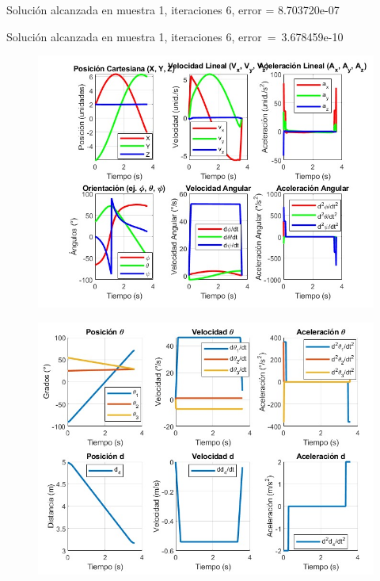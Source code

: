 Solución alcanzada en muestra 1, iteraciones 6, error = 8.703720e-07

Solución alcanzada en muestra 1, iteraciones 6, error = 3.678459e-10


\vspace{10mm}

\begin{figure}[h]
	\centering
	\includegraphics[width=0.6\linewidth]{img/R2}
	\caption{}
	\label{fig}
\end{figure}

\begin{figure}[h]
	\centering
	\includegraphics[width=0.6\linewidth]{img/R2 2}
	\caption{}
	\label{fig}
\end{figure}

\vspace{5mm}